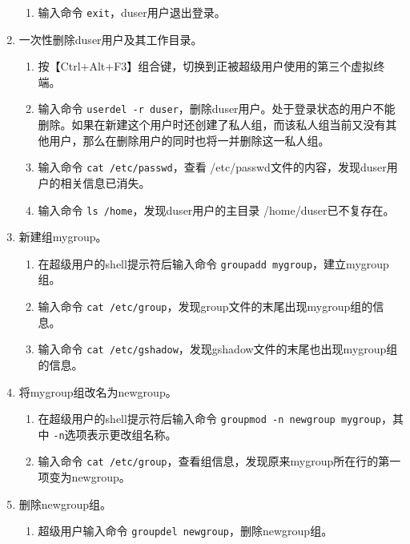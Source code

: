 \begin{enumerate}
\begin{enumerate}
      \item 输入命令 \verb|exit|，duser用户退出登录。
    \end{enumerate}
  \item 一次性删除duser用户及其工作目录。
    \begin{enumerate}
      \item 按【Ctrl+Alt+F3】组合键，切换到正被超级用户使用的第三个虚拟终端。
      \item 输入命令 \verb|userdel -r duser|，删除duser用户。处于登录状态的用户不能删除。如果在新建这个用户时还创建了私人组，而该私人组当前又没有其他用户，那么在删除用户的同时也将一并删除这一私人组。
      \item 输入命令 \verb|cat /etc/passwd|，查看 /etc/passwd文件的内容，发现duser用户的相关信息已消失。
      \item 输入命令 \verb|ls /home|，发现duser用户的主目录 /home/duser已不复存在。
    \end{enumerate}
  \item 新建组mygroup。
    \begin{enumerate}
      \item 在超级用户的shell提示符后输入命令 \verb|groupadd mygroup|，建立mygroup组。
      \item 输入命令 \verb|cat /etc/group|，发现group文件的末尾出现mygroup组的信息。
      \item 输入命令 \verb|cat /etc/gshadow|，发现gshadow文件的末尾也出现mygroup组的信息。
    \end{enumerate}
  \item 将mygroup组改名为newgroup。
    \begin{enumerate}
      \item 在超级用户的shell提示符后输入命令 \verb|groupmod -n newgroup mygroup|，其中 \verb|-n|选项表示更改组名称。
      \item 输入命令 \verb|cat /etc/group|，查看组信息，发现原来mygroup所在行的第一项变为newgroup。
    \end{enumerate}
  \item 删除newgroup组。
    \begin{enumerate}
      \item 超级用户输入命令 \verb|groupdel newgroup|，删除newgroup组。
    \end{enumerate}
\end{enumerate}

